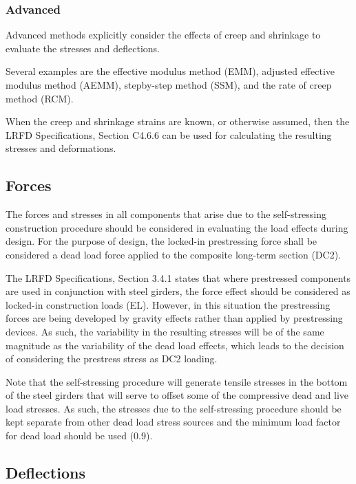 \subsubsection{Advanced}

Advanced methods explicitly consider the effects of creep and shrinkage to evaluate the stresses and deflections.

Several examples are the effective modulus method (EMM), adjusted effective modulus method (AEMM), stepby-step method (SSM), and the rate of creep method (RCM).

When the creep and shrinkage strains are known, or otherwise assumed, then the LRFD Specifications, Section C4.6.6 can be used for calculating the resulting stresses and deformations.

\subsection{Forces}

The forces and stresses in all components that arise due to the self-stressing construction procedure should be considered in evaluating the load effects during design. For the purpose of design, the locked-in prestressing force shall be considered a dead load force applied to the composite long-term section (DC2).


The LRFD Specifications, Section 3.4.1 states that where prestressed components are used in conjunction with steel girders, the force effect should be considered as locked-in construction loads (EL). However, in this situation the prestressing forces are being developed by gravity effects rather than applied by prestressing devices. As such, the variability in the resulting stresses will be of the same magnitude as the variability of the dead load effects, which leads to the decision of considering the prestress stress as DC2 loading.


Note that the self-stressing procedure will generate tensile stresses in the bottom of the steel girders that will serve to offset some of the compressive dead and live load stresses. As such, the stresses due to the self-stressing procedure should be kept separate from other dead load stress sources and the minimum load factor for dead load should be used (0.9).

\subsection{Deflections}

